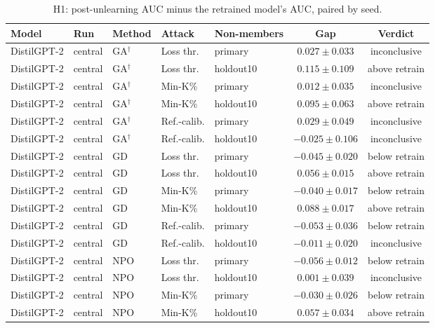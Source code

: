 \begin{table}[t]
\centering
\caption{H1: post-unlearning AUC minus the retrained model's AUC, paired by seed.}
\label{tab:h1}
\footnotesize
\renewcommand{\arraystretch}{1.2}
\setlength{\tabcolsep}{5pt}
\begin{tabular*}{\textwidth}{@{\extracolsep{\fill}}lllllcc@{}}
\toprule
\textbf{Model} & \textbf{Run} & \textbf{Method} & \textbf{Attack} & \textbf{Non-members} & \textbf{Gap} & \textbf{Verdict} \\
\midrule
DistilGPT-2 & central & GA$^{\dagger}$ & Loss thr. & primary & $0.027 \pm 0.033$ & inconclusive \\
DistilGPT-2 & central & GA$^{\dagger}$ & Loss thr. & holdout10 & $0.115 \pm 0.109$ & above retrain \\
DistilGPT-2 & central & GA$^{\dagger}$ & Min-K\% & primary & $0.012 \pm 0.035$ & inconclusive \\
DistilGPT-2 & central & GA$^{\dagger}$ & Min-K\% & holdout10 & $0.095 \pm 0.063$ & above retrain \\
DistilGPT-2 & central & GA$^{\dagger}$ & Ref.-calib. & primary & $0.029 \pm 0.049$ & inconclusive \\
DistilGPT-2 & central & GA$^{\dagger}$ & Ref.-calib. & holdout10 & $-0.025 \pm 0.106$ & inconclusive \\
DistilGPT-2 & central & GD & Loss thr. & primary & $-0.045 \pm 0.020$ & below retrain \\
DistilGPT-2 & central & GD & Loss thr. & holdout10 & $0.056 \pm 0.015$ & above retrain \\
DistilGPT-2 & central & GD & Min-K\% & primary & $-0.040 \pm 0.017$ & below retrain \\
DistilGPT-2 & central & GD & Min-K\% & holdout10 & $0.088 \pm 0.017$ & above retrain \\
DistilGPT-2 & central & GD & Ref.-calib. & primary & $-0.053 \pm 0.036$ & below retrain \\
DistilGPT-2 & central & GD & Ref.-calib. & holdout10 & $-0.011 \pm 0.020$ & inconclusive \\
DistilGPT-2 & central & NPO & Loss thr. & primary & $-0.056 \pm 0.012$ & below retrain \\
DistilGPT-2 & central & NPO & Loss thr. & holdout10 & $0.001 \pm 0.039$ & inconclusive \\
DistilGPT-2 & central & NPO & Min-K\% & primary & $-0.030 \pm 0.026$ & below retrain \\
DistilGPT-2 & central & NPO & Min-K\% & holdout10 & $0.057 \pm 0.034$ & above retrain \\

\end{tabular*}
\end{table}
